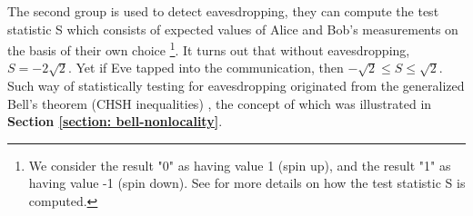 The second group is used to detect eavesdropping, they can compute the test statistic S which consists of expected values of Alice and Bob's measurements on the basis of their own choice \footnote{We consider the result "0" as having value 1 (spin up), and the result "1" as having value -1 (spin down). See \cite{Ekert1991} for more details on how the test statistic S is computed.}. It turns out that without eavesdropping, $S=-2\sqrt{2}$. Yet if Eve tapped into the communication, then $-\sqrt{2} \le S \le \sqrt{2}$. Such way of statistically testing for eavesdropping originated from the generalized Bell's theorem (CHSH inequalities) \cite{bell1964}, the concept of which was illustrated in \textbf{Section \ref{section: bell-nonlocality}}.

